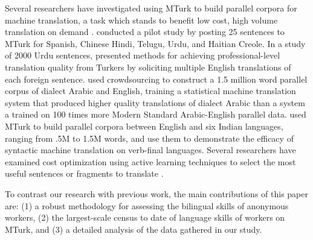 \documentclass[11pt]{article}
\begin{document}
Several researchers have investigated using MTurk to build parallel corpora for machine translation, a task which stands to benefit low cost, high volume  translation on demand \cite{Germann2001}.   conducted a pilot study by posting 25 sentences to MTurk for Spanish, Chinese Hindi, Telugu, Urdu, and Haitian Creole.  In a study of 2000 Urdu sentences, 
 presented methods for achieving professional-level translation quality from Turkers by soliciting multiple English translations of each foreign sentence. 
 used crowdsourcing to construct a 1.5 million word parallel corpus of dialect Arabic and English, training a statistical machine translation system that produced higher quality translations of dialect Arabic than a system a trained on 100 times more Modern Standard Arabic-English parallel data.   used MTurk to build parallel corpora between English and six Indian languages, ranging from .5M to 1.5M words, and use them to demonstrate the efficacy of syntactic machine translation on verb-final languages.  
Several researchers have examined cost optimization using active learning techniques to select the most useful sentences or fragments to translate \cite{ambati_naacl,bloodgood-callisonburch:2010:ACL,AmbatiThesis}.

To contrast our research with previous work, the main contributions of this paper are: (1) a robust methodology for assessing the bilingual  skills of anonymous workers, (2) the largest-scale census to date of language skills of workers on MTurk, and (3) a detailed analysis of the data gathered in our study.



%
\end{document}
